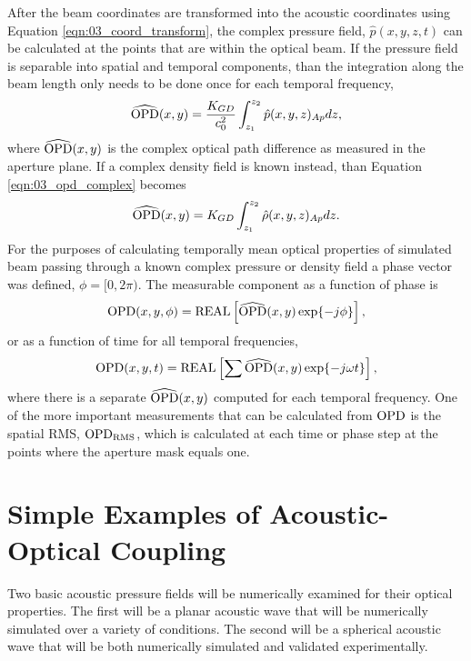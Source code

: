 After the beam coordinates are transformed into the acoustic coordinates using Equation \ref{eqn:03_coord_transform}, the complex pressure field, $\hat{p}(x,y,z,t)$ can be calculated at the points that are within the optical beam.
If the pressure field is separable into spatial and temporal components, than the integration along the beam length only needs to be done once for each temporal frequency,
\begin{equation}
  \widehat{\operatorname{OPD}}(x,y) = \frac{K_{GD}}{c_0^2}\int_{z_1}^{z_2} \hat{p}(x,y,z)_{Ap}dz \textrm{,}
  \label{eqn:03_opd_complex}
\end{equation}
where $\widehat{\operatorname{OPD}}(x,y)$ is the complex optical path difference as measured in the aperture plane.
If a complex density field is known instead, than Equation \ref{eqn:03_opd_complex} becomes
\begin{equation}
  \widehat{\operatorname{OPD}}(x,y) = K_{GD}\int_{z_1}^{z_2} \hat{\rho}(x,y,z)_{Ap}dz \textrm{.}
  \label{eqn:03_opd_complex_density}
\end{equation}
For the purposes of calculating temporally mean optical properties of simulated beam passing through a known complex pressure or density field a phase vector was defined,  $\phi = [0, 2\pi)$.
The measurable component as a function of phase is
\begin{equation}
  \operatorname{OPD}(x,y,\phi) = \operatorname{REAL}\left[\widehat{\operatorname{OPD}}(x,y)\exp\{-j\phi\}\right] \textrm{,}
  \label{eqn:03_opd_real_phase}
\end{equation}
or as a function of time for all temporal frequencies,
\begin{equation}
  \operatorname{OPD}(x,y,t) = \operatorname{REAL}\left[\sum\widehat{\operatorname{OPD}}(x,y)\exp\{-j\omega t\}\right] \textrm{,}
  \label{eqn:03_opd_real}
\end{equation}
where there is a separate $\widehat{\operatorname{OPD}}(x,y)$ computed for each temporal frequency.
One of the more important measurements that can be calculated from $\operatorname{OPD}$ is the spatial RMS, $\operatorname{OPD_{RMS}}$, which is calculated at each time or phase step at the points where the aperture mask equals one.

\section{Simple Examples of Acoustic-Optical Coupling}
Two basic acoustic pressure fields will be numerically examined for their optical properties.
The first will be a planar acoustic wave that will be numerically simulated over a variety of conditions.
The second will be a spherical acoustic wave that will be both numerically simulated and validated experimentally.

